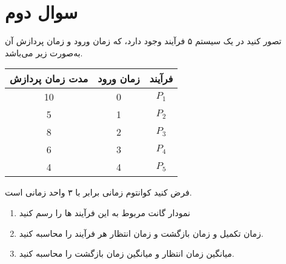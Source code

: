 \section{سوال دوم}

تصور کنید در یک سیستم ۵ فرآیند وجود دارد، که زمان ورود  و زمان پردازش  آن به‌صورت زیر می‌باشد.


\begin{center}
	\begin{tabular}{||c|c|c||}
		\hline 
		مدت زمان پردازش & زمان ورود & فرآیند \\
		\hline \hline
		10 & 0 & $P_1$ \\
		5 & 1 & $P_2$ \\
		8 & 2 & $P_3$ \\
		6 & 3 & $P_4$ \\
		4 & 4 & $P_5$ \\
		\hline
	\end{tabular}
\end{center}



فرض کنید کوانتوم زمانی برابر با ۳ واحد زمانی است.

\begin{enumerate}
	\item 
	نمودار گانت مربوط به این فرآیند ها را رسم کنید
	
	
	\item 
	زمان تکمیل  و زمان بازگشت  و زمان انتظار  هر فرآیند را محاسبه کنید.


	\item 
	میانگین زمان انتظار  و میانگین زمان بازگشت  را محاسبه کنید.


\end{enumerate}

